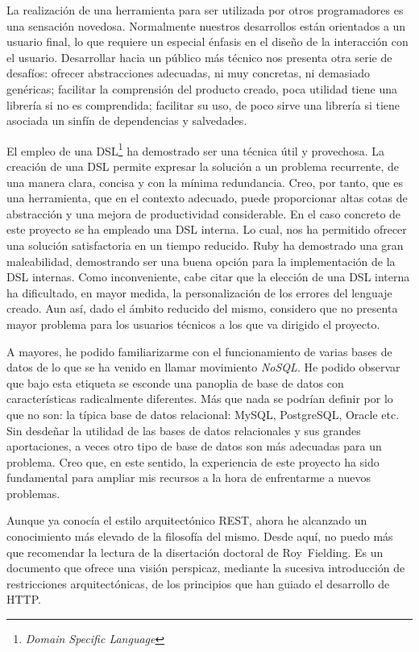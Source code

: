 La realización de una herramienta para ser utilizada por otros
programadores es una sensación novedosa. Normalmente nuestros
desarrollos están orientados a un usuario final, lo que requiere un
especial énfasis en el diseño de la interacción con el usuario.
Desarrollar hacia un público más técnico nos presenta otra serie de
desafíos: ofrecer abstracciones adecuadas, ni muy concretas, ni
demasiado genéricas; facilitar la comprensión del producto creado,
poca utilidad tiene una librería si no es comprendida; facilitar su
uso, de poco sirve una librería si tiene asociada un sinfín de
dependencias y salvedades.

El empleo de una DSL\footnote{\emph{Domain Specific Language}} ha
demostrado ser una técnica útil y provechosa. La creación de una DSL
permite expresar la solución a un problema recurrente, de una manera
clara, concisa y con la mínima redundancia. Creo, por tanto, que es
una herramienta, que en el contexto adecuado, puede proporcionar altas
cotas de abstracción y una mejora de productividad considerable. En el
caso concreto de este proyecto se ha empleado una DSL interna. Lo
cual, nos ha permitido ofrecer una solución satisfactoria en un tiempo
reducido. Ruby ha demostrado una gran maleabilidad, demostrando ser
una buena opción para la implementación de la DSL internas. Como
inconveniente, cabe citar que la elección de una DSL interna ha
dificultado, en mayor medida, la personalización de los errores del
lenguaje creado. Aun así, dado el ámbito reducido del mismo, considero
que no presenta mayor problema para los usuarios técnicos a los que va
dirigido el proyecto.

A mayores, he podido familiarizarme con el funcionamiento de varias
bases de datos de lo que se ha venido en llamar movimiento
\emph{NoSQL}. He podido observar que bajo esta etiqueta se esconde
una panoplia de base de datos con características radicalmente
diferentes. Más que nada se podrían definir por lo que no son: la
típica base de datos relacional: MySQL, PostgreSQL, Oracle etc.
Sin desdeñar la utilidad de las bases de datos relacionales y sus
grandes aportaciones, a veces otro tipo de base de datos son más
adecuadas para un problema. Creo que, en este sentido, la experiencia
de este proyecto ha sido fundamental para ampliar mis recursos a la
hora de enfrentarme a nuevos problemas.

Aunque ya conocía el estilo arquitectónico REST, ahora he alcanzado un
conocimiento más elevado de la filosofía del mismo. Desde aquí, no
puedo más que recomendar la lectura de la disertación doctoral de
Roy~Fielding\cite{REST}. Es un documento que ofrece una visión
perspicaz, mediante la sucesiva introducción de restricciones
arquitectónicas, de los principios que han guiado el desarrollo de
HTTP.

